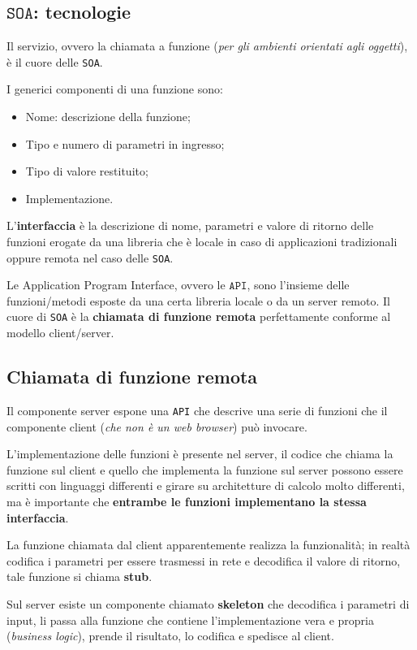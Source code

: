 \documentclass[oneside,a4paper,11pt]{book}
\theoremstyle{italicstyle}
\theoremstyle{normStyle}
\begin{document}
\subsection{$\texttt{SOA}$: tecnologie}
Il servizio, ovvero la chiamata a funzione (\textit{per gli ambienti 
orientati agli oggetti}), è il cuore delle \verb|SOA|.

I generici componenti di una funzione sono:
\begin{itemize}
  \item Nome: descrizione della funzione;
  \item Tipo e numero di parametri in ingresso;
  \item Tipo di valore restituito;
  \item Implementazione.
\end{itemize}
L'\textbf{interfaccia} è la descrizione di nome, parametri e valore di ritorno delle funzioni erogate da 
una libreria che è locale in caso di applicazioni tradizionali oppure 
remota nel caso delle \verb|SOA|.

Le Application Program Interface, ovvero le \textbf{$\texttt{API}$}, sono l'insieme 
delle funzioni/metodi esposte da una certa libreria locale o da un server 
remoto.
Il cuore di \verb|SOA| è la \textbf{chiamata di funzione remota} perfettamente conforme al 
modello client/server.
\subsection{Chiamata di funzione remota}
Il componente server espone una \verb|API| che descrive una serie di 
funzioni che il componente client (\textit{che non è un web browser})
può invocare.

L'implementazione delle funzioni è presente nel server, il codice che chiama 
la funzione sul client e quello che implementa la funzione sul server 
possono essere scritti con linguaggi differenti e girare su architetture di calcolo molto
differenti, ma è importante che \textbf{entrambe le funzioni implementano la stessa 
interfaccia}.

La funzione chiamata dal client apparentemente realizza la funzionalità;
in realtà codifica i parametri per essere trasmessi in rete e decodifica il 
valore di ritorno, tale funzione si chiama \textbf{stub}.

Sul server esiste un componente chiamato \textbf{skeleton} che decodifica 
i parametri di input, li passa alla funzione che contiene l'implementazione 
vera e propria (\textit{business logic}), prende il risultato, lo codifica e spedisce 
al client.
\end{document}
